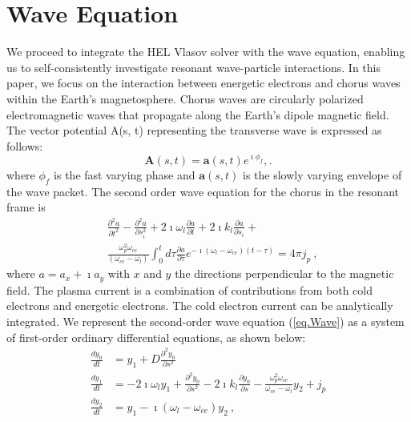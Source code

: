\section{Wave Equation}
\label{sec:wave}

We proceed to integrate the HEL Vlasov solver with the wave equation, enabling us to self-consistently investigate resonant wave-particle interactions. In this paper, we focus on the interaction between energetic electrons and chorus waves within the Earth's magnetosphere. Chorus waves are circularly polarized electromagnetic waves that propagate along the Earth's dipole magnetic field. The vector potential A(s, t) representing the transverse wave is expressed as follows:
\begin{equation}
    \mathbf{A}(s,t) = \mathbf{a}(s,t)e^{\imath \phi_f},.
\end{equation}
where $\phi_f$ is the fast varying phase and $\mathbf{a}(s,t)$ is the slowly varying envelope of the wave packet. 
The second order wave equation for the chorus in the resonant frame  is 
\begin{equation}\label{eq.Wave}
    \begin{aligned}
        &\frac{\partial^2 a}{\partial t^2} - \frac{\partial^2 a}{\partial s_i^2} + {2\imath\omega_l}\frac{\partial a}{\partial t} + 2\imath k_l\frac{\partial a}{\partial s_i} + \\
        &\frac{\omega_p^2 \omega_{ce}}{(\omega_{ce}-\omega_l)} \int_0^t d \tau \frac{\partial a}{\partial \tau} e^{-\imath\left(\omega_l-\omega_{c e}\right)(t-\tau)} = {4\pi}j_p~,
        \end{aligned}
      \end{equation}
where $a = a_x + \imath a_y$ with $x$ and $y$ the directions perpendicular to the  magnetic field. 
The plasma current is a combination of contributions from both cold electrons and energetic electrons. The cold electron current can be analytically integrated. We represent the second-order wave equation (\ref{eq.Wave}) as a system of first-order ordinary differential equations, as shown below:
\begin{equation}\label{eq.Wave2}
    \begin{aligned}
        \frac{d y_0}{d t} & = y_1 + D \frac{\partial^2 y_0}{\partial s^2}
        \\
        \frac{d y_1}{d t} & =-2 \imath \omega_l y_1+\frac{\partial^2 y_0}{\partial s^2}-2 \imath k_l \frac{\partial y_0}{\partial s}- \frac{\omega^2_p\omega_{ce}}{\omega_{ce}-\omega_l}y_{2} +j_p\\
        \frac{d y_2}{d t} & =y_1-\imath\left(\omega_l-\omega_{ce}\right) y_2~,
        \end{aligned}
\end{equation}
